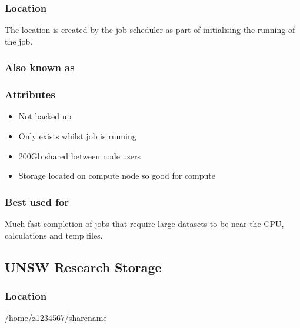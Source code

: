 \documentclass[letterpaper,10pt,english]{sphinxmanual}
\begin{document}
\subsubsection{Location}
\label{\detokenize{storage/storage_locations:id8}}
The location is created by the job scheduler as part of initialising the running of the job.


\subsubsection{Also known as}
\label{\detokenize{storage/storage_locations:id9}}
\begin{sphinxVerbatim}[commandchars=\\\{\}]
\end{sphinxVerbatim}


\subsubsection{Attributes}
\label{\detokenize{storage/storage_locations:id10}}\begin{itemize}
\item {} 
Not backed up

\item {} 
Only exists whilst job is running

\item {} 
200Gb shared between node users

\item {} 
Storage located on compute node so good for compute

\end{itemize}


\subsubsection{Best used for}
\label{\detokenize{storage/storage_locations:id11}}
Much fast completion of jobs that require large datasets to be near the CPU, calculations and temp files.


\subsection{UNSW Research Storage}
\label{\detokenize{storage/storage_locations:unsw-research-storage}}

\subsubsection{Location}
\label{\detokenize{storage/storage_locations:id12}}
\begin{sphinxVerbatim}[commandchars=\\\{\}]
/home/z1234567/sharename
\end{sphinxVerbatim}
\end{document}
